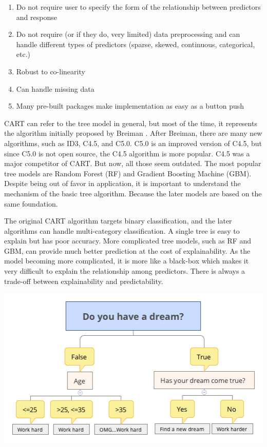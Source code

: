 \documentclass[12pt,]{krantz}
\providecommand{\tightlist}{%
  \setlength{\itemsep}{0pt}\setlength{\parskip}{0pt}}
\begin{document}
\begin{enumerate}
\def\labelenumi{\arabic{enumi}.}
\tightlist
\item
  Do not require user to specify the form of the relationship between predictors and response
\item
  Do not require (or if they do, very limited) data preprocessing and can handle different types of predictors (sparse, skewed, continuous, categorical, etc.)
\item
  Robust to co-linearity
\item
  Can handle missing data
\item
  Many pre-built packages make implementation as easy as a button push
\end{enumerate}

CART can refer to the tree model in general, but most of the time, it represents the algorithm initially proposed by Breiman \citep{Breiman1984}. After Breiman, there are many new algorithms, such as ID3, C4.5, and C5.0. C5.0 is an improved version of C4.5, but since C5.0 is not open source, the C4.5 algorithm is more popular. C4.5 was a major competitor of CART. But now, all those seem outdated. The most popular tree models are Random Forest (RF) and Gradient Boosting Machine (GBM). Despite being out of favor in application, it is important to understand the mechanism of the basic tree algorithm. Because the later models are based on the same foundation.

The original CART algorithm targets binary classification, and the later algorithms can handle multi-category classification. A single tree is easy to explain but has poor accuracy. More complicated tree models, such as RF and GBM, can provide much better prediction at the cost of explainability. As the model becoming more complicated, it is more like a black-box which makes it very difficult to explain the relationship among predictors. There is always a trade-off between explainability and predictability.

\includegraphics{../linhui.org/book/Figure/treeEN.png}
\end{document}
